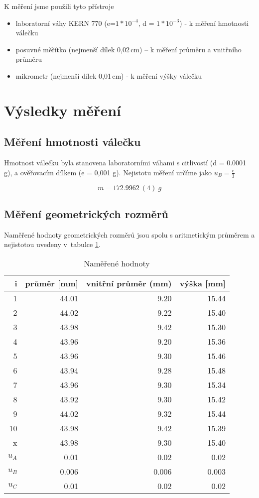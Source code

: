 \documentclass[a4paper,11pt]{article}
\begin{document}
K měření jsme použili tyto přístroje
\begin{itemize}
  \item laboratorní váhy KERN 770 (e=$1 * 10 ^ {-4}$, d =  $1 * 10^{-3}$) - k měření hmotnosti válečku
    \item posuvné měřítko (nejmenší dílek 0,02\,cm) -- k měření průměru a vnitřního průměru
    \item mikrometr (nejmenší dílek 0,01\,cm) - k měření výšky válečku
\end{itemize}

\section{Výsledky měření}

\subsection{Měření hmotnosti válečku}
Hmotnost válečku byla stanovena laboratorními váhami s citlivostí (d = 0.0001 g), 
a ověřovacím dílkem (e = 0,001 g). Nejistotu měření určíme jako $u_B = \frac{e}{3}$

\begin{equation}
m = 172.9962\ (4)\ g
\end{equation}

\subsection{Měření geometrických rozměrů}
Naměřené hodnoty geometrických rozměrů jsou spolu s aritmetickým průměrem a nejistotou uvedeny v~tabulce \ref{tb:mer}.


\begin{table}[ht]
\centering

\begin{tabular}{| r | r | r | r |}
\hline
i & průměr [mm] & vnitřní průměr (mm) & výška [mm] \\
\hline\hline
1 & 44.01 & 9.20 & 15.44 \\
2 & 44.02 & 9.22 & 15.40 \\
3 & 43.98 & 9.42 & 15.30 \\
4 & 43.96 & 9.20 & 15.36 \\
5 & 43.96 & 9.30 & 15.46 \\
6 & 43.94 & 9.28 & 15.48 \\
7 & 43.96 & 9.30 & 15.34 \\
8 & 43.92 & 9.30 & 15.42 \\
9 & 44.02 & 9.32 & 15.44 \\
10 & 43.98 & 9.42 & 15.39 \\
\hline\hline
x & 43.98 & 9.30 & 15.40 \\\hline
$u_A$ & 0.01 & 0.02 & 0.02 \\\hline
$u_B$ & 0.006 & 0.006 & 0.003 \\\hline
$u_C$ & 0.01 & 0.02 & 0.02\\\hline

\end{tabular}
\caption{Naměřené hodnoty}
\label{tb:mer}
\end{table}
\end{document}
